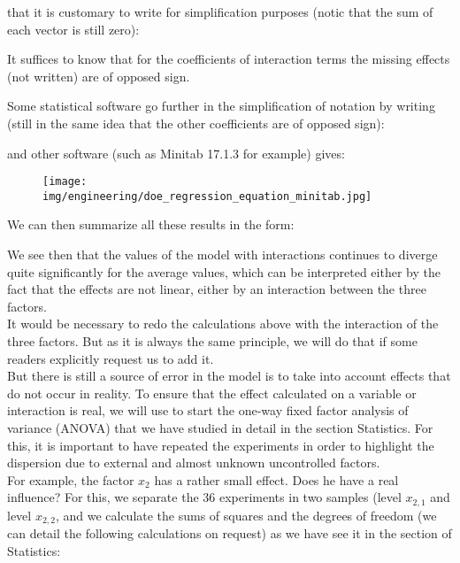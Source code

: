 	that it is customary to write for simplification purposes (notic that the sum of each vector is still zero):
	
	\begin{tcolorbox}[title=Remark,colframe=black,arc=10pt]
	It suffices to know that for the coefficients of interaction terms the missing effects (not written) are of opposed sign.
	\end{tcolorbox}
	Some statistical software go further in the simplification of notation by writing (still in the same idea that the other coefficients are of opposed sign):
	
	and other software (such as Minitab 17.1.3 for example) gives:
	\begin{figure}[H]
		\centering
		\texttt{[image: img/engineering/doe\_regression\_equation\_minitab.jpg]}	
	\end{figure}

	We can then summarize all these results in the form:
	
	We see then that the values of the model with interactions continues to diverge quite significantly for the average values, which can be interpreted either by the fact that the effects are not linear, either by an interaction between the three factors.\\
	
	It would be necessary to redo the calculations above with the interaction of the three factors. But as it is always the same principle, we will do that if some readers explicitly request us to add it.\\

	But there is still a source of error in the model is to take into account effects that do not occur in reality. To ensure that the effect calculated on a variable or interaction is real, we will use to start the one-way fixed factor analysis of variance (ANOVA) that we have studied in detail in the section Statistics. For this, it is important to have repeated the experiments in order to highlight the dispersion due to external and almost unknown uncontrolled factors.\\

	For example, the factor $x_2$ has a rather small effect. Does he have a real influence? For this, we separate the $36$ experiments in two samples (level $x_{2,1}$ and level $x_{2,2}$, and we calculate the sums of squares and the degrees of freedom (we can detail the following calculations on request) as we have see it in the section of Statistics:
	
